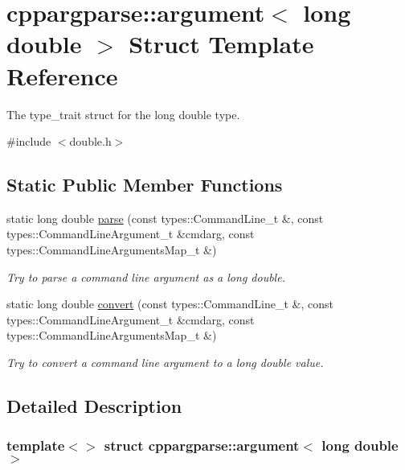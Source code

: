 \hypertarget{structcppargparse_1_1argument_3_01long_01double_01_4}{}\section{cppargparse\+:\+:argument$<$ long double $>$ Struct Template Reference}
\label{structcppargparse_1_1argument_3_01long_01double_01_4}


The type\+\_\+trait struct for the long double type.  




{\ttfamily \#include $<$double.\+h$>$}

\subsection*{Static Public Member Functions}
\begin{DoxyCompactItemize}
\item 
static long double \hyperlink{structcppargparse_1_1argument_3_01long_01double_01_4_a82796643d277f58f8b65cd9552c1f598}{parse} (const types\+::\+Command\+Line\+\_\+t \&, const types\+::\+Command\+Line\+Argument\+\_\+t \&cmdarg, const types\+::\+Command\+Line\+Arguments\+Map\+\_\+t \&)
\begin{DoxyCompactList}\small\item\em Try to parse a command line argument as a long double. \end{DoxyCompactList}\item 
static long double \hyperlink{structcppargparse_1_1argument_3_01long_01double_01_4_a442a97b13effc88aae98a72fc754b912}{convert} (const types\+::\+Command\+Line\+\_\+t \&, const types\+::\+Command\+Line\+Argument\+\_\+t \&cmdarg, const types\+::\+Command\+Line\+Arguments\+Map\+\_\+t \&)
\begin{DoxyCompactList}\small\item\em Try to convert a command line argument to a long double value. \end{DoxyCompactList}\end{DoxyCompactItemize}


\subsection{Detailed Description}
\subsubsection*{template$<$$>$\newline
struct cppargparse\+::argument$<$ long double $>$}

